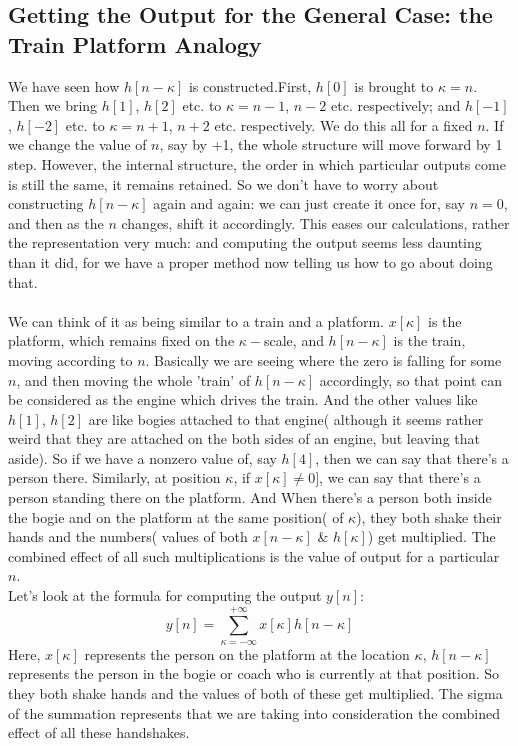 \subsection{Getting the Output for the General Case: the Train Platform Analogy}
We have seen how $h[n-\kappa]$ is constructed.First, $h[0]$ is brought to $\kappa=n$. Then we bring $h[1]$, $h[2]$ etc. to $\kappa=n-1$, $n-2$ etc. respectively; and $h[-1]$, $h[-2]$ etc. to $\kappa=n+1$, $n+2$ etc. respectively. We do this all for a fixed $n$. If we change the value of $n$, say by +1, the whole structure will move forward by 1 step. However, the internal structure, the order in which particular outputs come is still the same, it remains retained. So we don't have to worry about constructing $h[n-\kappa]$ again and again: we can just create it once for, say $n=0$, and then as the $n$ changes, shift it accordingly. This eases our calculations, rather the representation very much: and computing the output seems less daunting than it did, for we have a proper method now telling us how to go about doing that.\\\\
We can think of it as being similar to a train and a platform. $x[\kappa]$ is the platform, which remains fixed on the $\kappa-$scale, and $h[n-\kappa]$ is the train, moving according to $n$. Basically we are seeing where the zero is falling for some $n$, and then moving the whole 'train' of $h[n-\kappa]$ accordingly, so that point can be considered as the engine which drives the train. And the other values like $h[1]$, $h[2]$ are like bogies attached to that engine( although it seems rather weird that they are attached on the both sides of an engine, but leaving that aside). So if we have a nonzero value of, say $h[4]$, then we can say that there's a person there. Similarly, at position $\kappa$, if $x[\kappa]\neq 0]$, we can say that there's a person standing there on the platform. And When there's a person both inside the bogie and on the platform at the same position( of $\kappa$), they both shake their hands and the numbers( values of both $x[n-\kappa]$ \& $h[\kappa]$) get multiplied. The combined effect of all such multiplications is the value of output for a particular $n$.\\
Let's look at the formula for computing the output $y[n]$:
\begin{equation}
y[n]=\sum_{\kappa=-\infty}^{+\infty} x[\kappa]h[n-\kappa] \nonumber
\end{equation}
Here, $ x[\kappa]$ represents the person on the platform at the location $\kappa$, $h[n-\kappa]$ represents the person in the bogie or coach who is currently at that position. So they both shake hands and the values of both of these get multiplied. The sigma of the summation represents that we are taking into consideration the combined effect of all these handshakes.\\
